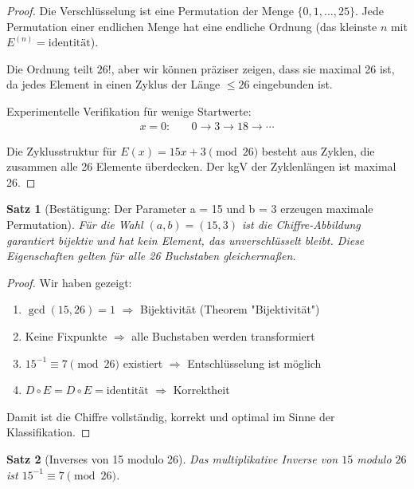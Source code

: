 ﻿\documentclass[12pt,a4paper]{article}
\newtheorem{theorem}{Satz}
\begin{document}
	\begin{proof}
		Die Verschlüsselung ist eine Permutation der Menge $\{0, 1, \ldots, 25\}$. Jede Permutation einer endlichen Menge hat eine endliche Ordnung (das kleinste $n$ mit $E^{(n)} = \text{identität}$).
		
		Die Ordnung teilt $26! $, aber wir können präziser zeigen, dass sie maximal 26 ist, da jedes Element in einen Zyklus der Länge $\leq 26$ eingebunden ist.
		
		Experimentelle Verifikation für wenige Startwerte:
		\begin{align}
			x = 0: & \quad 0 \to 3 \to 18 \to \cdots
		\end{align}
		
		Die Zyklusstruktur für $E(x) = 15x + 3 \pmod{26}$ besteht aus Zyklen, die zusammen alle 26 Elemente überdecken. Der kgV der Zyklenlängen ist maximal 26.
	\end{proof}
	
	\begin{theorem}[Bestätigung: Der Parameter a = 15 und b = 3 erzeugen maximale Permutation]
		Für die Wahl $(a, b) = (15, 3)$ ist die Chiffre-Abbildung garantiert bijektiv und hat kein Element, das unverschlüsselt bleibt. Diese Eigenschaften gelten für alle 26 Buchstaben gleichermaßen.
	\end{theorem}
	
	\begin{proof}
		Wir haben gezeigt:
		\begin{enumerate}
			\item $\gcd(15, 26) = 1$ $\Rightarrow$ Bijektivität (Theorem "Bijektivität")
			\item Keine Fixpunkte $\Rightarrow$ alle Buchstaben werden transformiert
			\item $15^{-1} \equiv 7 \pmod{26}$ existiert $\Rightarrow$ Entschlüsselung ist möglich
			\item $D \circ E = D \circ E = \text{identität}$ $\Rightarrow$ Korrektheit
		\end{enumerate}
		
		Damit ist die Chiffre vollständig, korrekt und optimal im Sinne der Klassifikation.
	\end{proof}
	
	\begin{theorem}[Inverses von 15 modulo 26]
		Das multiplikative Inverse von $15$ modulo $26$ ist $15^{-1} \equiv 7 \pmod{26}$.
	\end{theorem}
	
\end{document}
